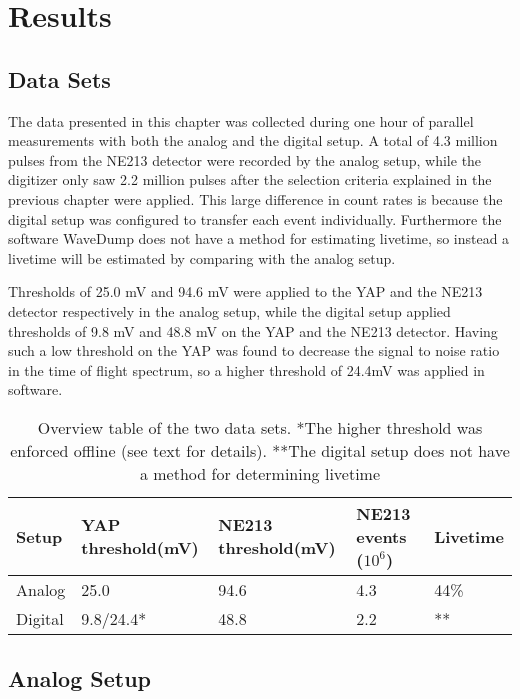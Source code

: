 \documentclass[main.tex]{subfiles}
\begin{document}
\chapter{Results}

\section{Data Sets}
The data presented in this chapter was collected during one hour of parallel measurements with both the analog and the digital setup. A total of 4.3 million pulses from the NE213 detector were recorded by the analog setup, while the digitizer only saw 2.2 million pulses after the selection criteria explained in the previous chapter were applied. This large difference in count rates is because the digital setup was configured to transfer each event individually. Furthermore the software WaveDump does not have a method for estimating livetime, so instead a livetime will be estimated by comparing with the analog setup.

Thresholds of 25.0 mV and 94.6 mV were applied to the YAP and the NE213 detector respectively in the analog setup, while the digital setup applied thresholds of 9.8 mV and 48.8 mV on the YAP and the NE213 detector. Having such a low threshold on the YAP was found to decrease the signal to noise ratio in the time of flight spectrum, so a higher threshold of 24.4\si{\milli\volt} was applied in software.
\begin{table}[bh]
\begin{tabular}{|l|l|l|l|l|}
\hline
Setup   & YAP threshold(mV) & NE213 threshold(mV) & NE213 events ($\text{10}^\text{6}$) & Livetime \\ \hline
Analog  & 25.0              & 94.6                & 4.3      & 44\%             \\ \hline
Digital & 9.8/24.4*			& 48.8                & 2.2      & **             \\ \hline
\end{tabular}
\caption[Overview table of the two data sets.]{Overview table of the two data sets. *The higher threshold was enforced offline (see text for details). **The digital setup does not have a method for determining livetime}
\label{tab:settings}
\end{table}

\section{Analog Setup}
\end{document}
